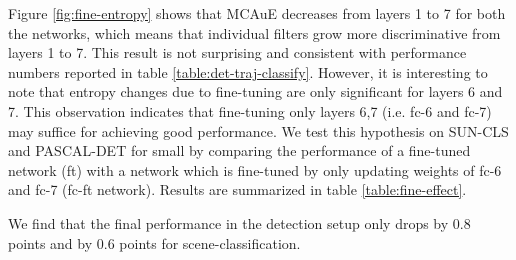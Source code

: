 Figure \ref{fig:fine-entropy} shows that MCAuE decreases from layers 1 to 7 for both the networks, which means that individual filters grow more discriminative from layers 1 to 7. This result is not surprising and consistent with performance numbers reported in table \ref{table:det-traj-classify}. However, it is interesting to note that entropy changes due to fine-tuning are only significant for layers 6 and 7. This observation indicates that fine-tuning only layers 6,7 (i.e. fc-6 and fc-7) may suffice for achieving good performance. We test this hypothesis on SUN-CLS and PASCAL-DET for small  by comparing the performance of a fine-tuned network (ft) with a network which is fine-tuned by only updating weights of fc-6 and fc-7 (fc-ft network). Results are summarized in table \ref{table:fine-effect}.

\setlength{\tabcolsep}{2pt}
\begin{table}[t!]
\begin{center}
\caption{Comparison in performance on of Alex-Net, Finetuned Network(ft-net) and a network with only fc layers finetuned (fc-ft).}
\label{table:fine-effect}
\end{center}
\end{table}
\setlength{\tabcolsep}{1.4pt}

We find that the final performance in the detection setup only drops by 0.8 points and by 0.6 points for scene-classification.  

